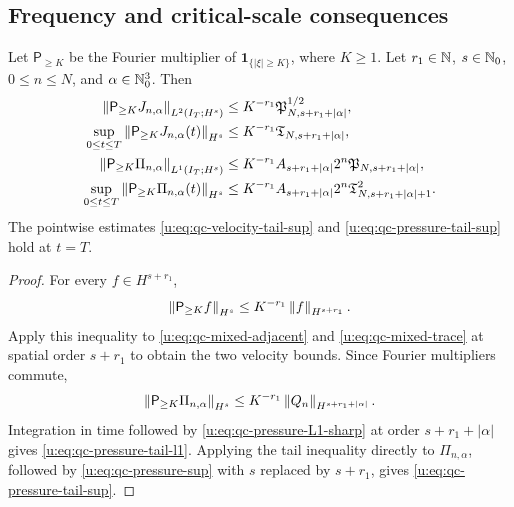 \subsection{Frequency and critical-scale consequences}

\begin{proposition}
\label{u:prop:qc-frequency-tails}
Let \(\mathsf P_{\ge K}\) be the Fourier multiplier of
\(\mathbf 1_{\{|\xi|\ge K\}}\), where \(K\ge1\).  Let
\(r_1\in\mathbb N\), \(s\in\mathbb N_0\), \(0\le n\le N\), and
\(\alpha\in\mathbb N_0^3\).  Then
\begin{align}
 \left\lVert \mathsf P_{\ge K}J_{n,\alpha}\right\rVert_{L^2(I_T;H^s)}
 &\le K^{-r_1}\mathfrak P_{N,s+r_1+|\alpha|}^{1/2},
 \label{u:eq:qc-velocity-tail-l2}\\
 \sup_{0\le t\le T}
 \left\lVert \mathsf P_{\ge K}J_{n,\alpha}(t)\right\rVert_{H^s}
 &\le K^{-r_1}\mathfrak T_{N,s+r_1+|\alpha|},
 \label{u:eq:qc-velocity-tail-sup}\\
 \left\lVert \mathsf P_{\ge K}\Pi_{n,\alpha}\right\rVert_{L^1(I_T;H^s)}
 &\le K^{-r_1}A_{s+r_1+|\alpha|}2^n
 \mathfrak P_{N,s+r_1+|\alpha|},
 \label{u:eq:qc-pressure-tail-l1}\\
 \sup_{0\le t\le T}
 \left\lVert \mathsf P_{\ge K}\Pi_{n,\alpha}(t)\right\rVert_{H^s}
 &\le K^{-r_1}A_{s+r_1+|\alpha|}2^n
 \mathfrak T_{N,s+r_1+|\alpha|+1}^2.
 \label{u:eq:qc-pressure-tail-sup}
\end{align}
The pointwise estimates \eqref{u:eq:qc-velocity-tail-sup} and
\eqref{u:eq:qc-pressure-tail-sup} hold at \(t=T\).
\end{proposition}

\begin{proof}
For every \(f\in H^{s+r_1}\),
\[
 \left\lVert \mathsf P_{\ge K}f\right\rVert_{H^s}
 \le K^{-r_1}\left\lVert f\right\rVert_{H^{s+r_1}}.
\]
Apply this inequality to
\eqref{u:eq:qc-mixed-adjacent} and \eqref{u:eq:qc-mixed-trace} at spatial order
\(s+r_1\) to obtain the two velocity bounds.  Since Fourier multipliers
commute,
\[
 \left\lVert \mathsf P_{\ge K}\Pi_{n,\alpha}\right\rVert_{H^s}
 \le K^{-r_1}\left\lVert Q_n\right\rVert_{H^{s+r_1+|\alpha|}}.
\]
Integration in time followed by
\eqref{u:eq:qc-pressure-L1-sharp} at order \(s+r_1+|\alpha|\) gives
\eqref{u:eq:qc-pressure-tail-l1}.  Applying the tail inequality directly to
\(\Pi_{n,\alpha}\), followed by \eqref{u:eq:qc-pressure-sup} with \(s\) replaced
by \(s+r_1\), gives \eqref{u:eq:qc-pressure-tail-sup}.
\end{proof}

